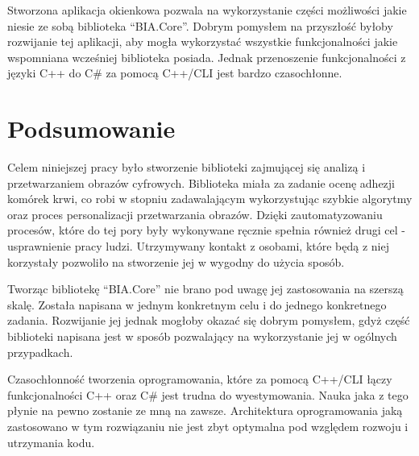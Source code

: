 \documentclass{article}
\begin{document}
    {
        \Large
        \justifying
        \quad
        Stworzona aplikacja okienkowa pozwala na wykorzystanie części możliwości jakie niesie ze sobą biblioteka ``BIA.Core''.
        Dobrym pomysłem na przyszłość byłoby rozwijanie tej aplikacji, aby mogła wykorzystać wszystkie funkcjonalności jakie wspomniana wcześniej biblioteka posiada.
        Jednak przenoszenie funkcjonalności z języki C++ do C\# za pomocą C++/CLI jest bardzo czasochłonne.
    }

    \newpage
    \section{Podsumowanie}
    {
        \Large
        \justifying
        \quad
        Celem niniejszej pracy było stworzenie biblioteki zajmującej się analizą i przetwarzaniem obrazów cyfrowych.
        Biblioteka miała za zadanie ocenę adhezji komórek krwi, co robi w stopniu zadawalającym wykorzystując szybkie algorytmy oraz proces personalizacji przetwarzania obrazów.
        Dzięki zautomatyzowaniu procesów, które do tej pory były wykonywane ręcznie spełnia również drugi cel - usprawnienie pracy ludzi.
        Utrzymywany kontakt z osobami, które będą z niej korzystały pozwoliło na stworzenie jej w wygodny do użycia sposób.
    }

    \vspace{0.5cm}

    {
        \Large
        \justifying
        \quad
        Tworząc bibliotekę ``BIA.Core'' nie brano pod uwagę jej zastosowania na szerszą skalę.
        Została napisana w jednym konkretnym celu i do jednego konkretnego zadania.
        Rozwijanie jej jednak mogłoby okazać się dobrym pomysłem, gdyż część biblioteki napisana jest w sposób pozwalający na wykorzystanie jej w ogólnych przypadkach.
    }

    \vspace{0.5cm}

    {
        \Large
        \justifying
        \quad
        Czasochłonność tworzenia oprogramowania, które za pomocą C++/CLI łączy funkcjonalności C++ oraz C\# jest trudna do wyestymowania.
        Nauka jaka z tego płynie na pewno zostanie ze mną na zawsze.
        Architektura oprogramowania jaką zastosowano w tym rozwiązaniu nie jest zbyt optymalna pod względem rozwoju i utrzymania kodu.
    }

    \newpage
\end{document}
